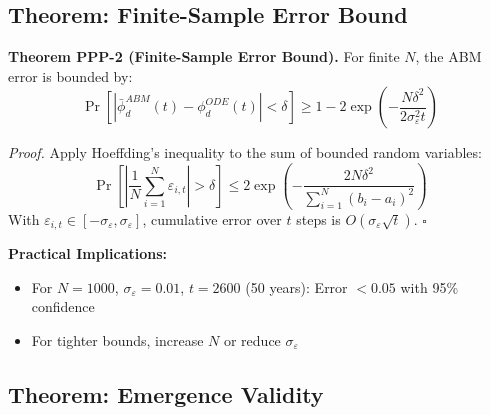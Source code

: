 \subsection{Theorem: Finite-Sample Error Bound}

\begin{tcolorbox}[colback=green!5!white, colframe=green!75!black, title=Theorem PPP-2: Finite-Sample Error]
\textbf{Theorem PPP-2 (Finite-Sample Error Bound).}
For finite $N$, the ABM error is bounded by:
\begin{equation}
\Pr\left[|\bar{\phi}^{ABM}_d(t) - \phi^{ODE}_d(t)| < \delta\right] \geq 1 - 2\exp\left(-\frac{N\delta^2}{2\sigma^2_\varepsilon t}\right)
\label{eq:ppp-error-bound}
\end{equation}

\textit{Proof.}
Apply Hoeffding's inequality to the sum of bounded random variables:
\begin{equation}
\Pr\left[\left|\frac{1}{N}\sum_{i=1}^{N} \varepsilon_{i,t}\right| > \delta\right] \leq 2\exp\left(-\frac{2N\delta^2}{\sum_{i=1}^{N}(b_i - a_i)^2}\right)
\end{equation}
With $\varepsilon_{i,t} \in [-\sigma_\varepsilon, \sigma_\varepsilon]$, cumulative error over $t$ steps is $O(\sigma_\varepsilon \sqrt{t})$.
\hfill $\square$
\end{tcolorbox}

\textbf{Practical Implications:}
\begin{itemize}[nosep]
\item For $N = 1000$, $\sigma_\varepsilon = 0.01$, $t = 2600$ (50 years): Error $< 0.05$ with 95\% confidence
\item For tighter bounds, increase $N$ or reduce $\sigma_\varepsilon$
\end{itemize}

\subsection{Theorem: Emergence Validity}

